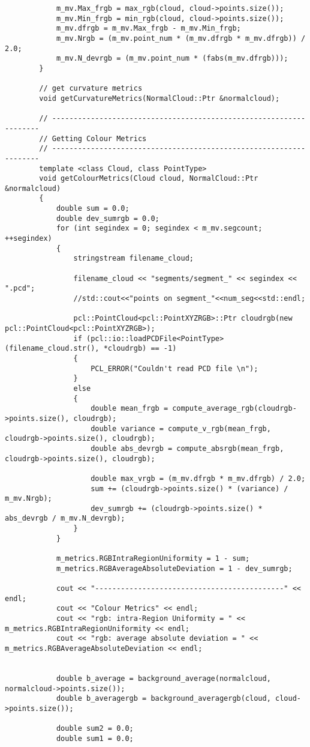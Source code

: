 \begin{lstlisting}
			m_mv.Max_frgb = max_rgb(cloud, cloud->points.size());
			m_mv.Min_frgb = min_rgb(cloud, cloud->points.size());
			m_mv.dfrgb = m_mv.Max_frgb - m_mv.Min_frgb;
			m_mv.Nrgb = (m_mv.point_num * (m_mv.dfrgb * m_mv.dfrgb)) / 2.0;
			m_mv.N_devrgb = (m_mv.point_num * (fabs(m_mv.dfrgb)));
		}

		// get curvature metrics
		void getCurvatureMetrics(NormalCloud::Ptr &normalcloud);

		// -------------------------------------------------------------------
		// Getting Colour Metrics
		// -------------------------------------------------------------------
		template <class Cloud, class PointType>
		void getColourMetrics(Cloud cloud, NormalCloud::Ptr &normalcloud)
		{
			double sum = 0.0;
			double dev_sumrgb = 0.0;
			for (int segindex = 0; segindex < m_mv.segcount; ++segindex)
			{
				stringstream filename_cloud;

				filename_cloud << "segments/segment_" << segindex << ".pcd";
				//std::cout<<"points on segment_"<<num_seg<<std::endl;

				pcl::PointCloud<pcl::PointXYZRGB>::Ptr cloudrgb(new pcl::PointCloud<pcl::PointXYZRGB>);
				if (pcl::io::loadPCDFile<PointType>(filename_cloud.str(), *cloudrgb) == -1)
				{
					PCL_ERROR("Couldn't read PCD file \n");
				}
				else
				{
					double mean_frgb = compute_average_rgb(cloudrgb->points.size(), cloudrgb);
					double variance = compute_v_rgb(mean_frgb, cloudrgb->points.size(), cloudrgb);
					double abs_devrgb = compute_absrgb(mean_frgb, cloudrgb->points.size(), cloudrgb);

					double max_vrgb = (m_mv.dfrgb * m_mv.dfrgb) / 2.0;
					sum += (cloudrgb->points.size() * (variance) / m_mv.Nrgb);
					dev_sumrgb += (cloudrgb->points.size() * abs_devrgb / m_mv.N_devrgb);
				}
			}

			m_metrics.RGBIntraRegionUniformity = 1 - sum;
			m_metrics.RGBAverageAbsoluteDeviation = 1 - dev_sumrgb;

			cout << "--------------------------------------------" << endl;
			cout << "Colour Metrics" << endl;
			cout << "rgb: intra-Region Uniformity = " << m_metrics.RGBIntraRegionUniformity << endl;
			cout << "rgb: average absolute deviation = " << m_metrics.RGBAverageAbsoluteDeviation << endl;


			double b_average = background_average(normalcloud, normalcloud->points.size());
			double b_averagergb = background_averagergb(cloud, cloud->points.size());

			double sum2 = 0.0;
			double sum1 = 0.0;


\end{lstlisting}
